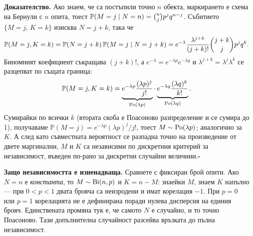 \begin{supp}
\textbf{Доказателство.} Ако знаем, че са постъпили точно $n$ обекта, маркирането е схема на
Бернули с $n$ опита, тоест $\mathbb{P}(M = j \mid N = n) = \binom{n}{j} p^j q^{n-j}$.
Събитието $\{M = j,\, K = k\}$ изисква $N = j+k$, така че
\[
\mathbb{P}(M = j, K = k) = \mathbb{P}(N = j+k)\,\mathbb{P}(M = j \mid N = j+k)
= e^{-\lambda}\frac{\lambda^{j+k}}{(j+k)!}\binom{j+k}{j} p^j q^k .
\]
Биномният коефициент съкращава $(j+k)!$, а $e^{-\lambda} = e^{-\lambda p}e^{-\lambda q}$ и
$\lambda^{j+k} = \lambda^j \lambda^k$ се разцепват по същата граница:
\[
\mathbb{P}(M = j, K = k)
= \underbrace{e^{-\lambda p}\frac{(\lambda p)^j}{j!}}_{\operatorname{Po}(\lambda p)}
\cdot \underbrace{e^{-\lambda q}\frac{(\lambda q)^k}{k!}}_{\operatorname{Po}(\lambda q)} .
\]
Сумирайки по всички $k$ (втората скоба е Поасоново разпределение и се сумира до 1),
получаваме $\mathbb{P}(M = j) = e^{-\lambda p}(\lambda p)^j / j!$, тоест $M \sim \operatorname{Po}(\lambda p)$;
аналогично за $K$. А след като съвместната вероятност се разпадна точно на произведение от
двете маргинални, $M$ и $K$ са независими по дискретния критерий за независимост,
въведен по-рано за дискретни случайни величини.\hfill$\square$

\textbf{Защо независимостта е изненадваща.} Сравнете с фиксиран брой опити. Ако $N = n$ е
\emph{константа}, то $M \sim \operatorname{Bi}(n,p)$ и $K = n - M$: знаейки $M$, знаем $K$ напълно —
при $0<p<1$ двата брояча са неизродени и имат корелация $-1$. При $p=0$ или $p=1$
корелацията не е дефинирана поради нулева дисперсия на единия брояч. Единствената промяна
тук е, че самото $N$ е случайно, и то точно Поасоново. Тази допълнителна случайност
разсейва връзката до пълна независимост.


\end{supp}
